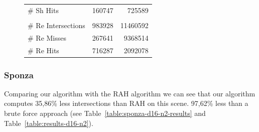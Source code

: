 \begin{figure}[!htb]
\begin{minipage}{0.725\linewidth}
\begin{tabular}[h]{l|rr}
            \quad \# Sh Hits            & 160747	& 725589	\\
            & & \\
            \quad \# Re Intersections   & 983928	& 11460592	\\
            \quad \# Re Misses          & 267641	& 9368514	\\
            \quad \# Re Hits            & 716287	& 2092078	\\            
        \end{tabular}
        \label{table:cornell-d16-n2-results}
    \end{minipage}
\end{figure}

\subsubsection{Sponza}


Comparing our algorithm with the RAH algorithm we can see that our algorithm computes 35,86\% less intersections than RAH on this scene. 97,62\% less than a brute force approach (see Table~\ref{table:sponza-d16-n2-results} and Table~\ref{table:results-d16-n2}).


